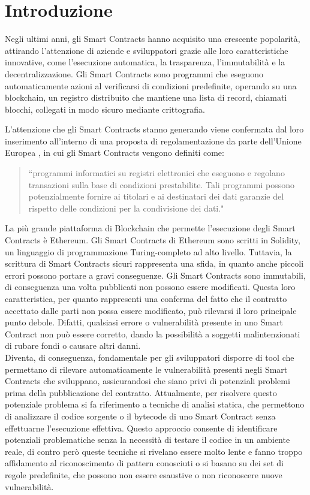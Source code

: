 \documentclass[../../Thesis.tex]{subfiles}
\begin{document}
\chapter{Introduzione}
Negli ultimi anni, gli Smart Contracts hanno acquisito una crescente popolarit\`a, attirando l'attenzione di aziende e sviluppatori grazie alle loro caratteristiche innovative, come l'esecuzione automatica, la trasparenza, l'immutabilit\`a e la decentralizzazione. Gli Smart Contracts sono programmi che eseguono automaticamente azioni al verificarsi di condizioni predefinite, operando su una blockchain, un registro distribuito che mantiene una lista di record, chiamati blocchi, collegati in modo sicuro mediante crittografia.

L'attenzione che gli Smart Contracts stanno generando viene confermata dal loro inserimento all'interno di una proposta di regolamentazione da parte dell'Unione Europea \cite{DataAct}, in cui gli Smart Contracts vengono definiti come: 
\begin{quotation}
    ``programmi informatici su registri elettronici che eseguono e regolano transazioni sulla base di condizioni prestabilite. Tali programmi possono potenzialmente fornire ai titolari e ai destinatari dei dati garanzie del rispetto delle condizioni per la condivisione dei dati."
\end{quotation}


La pi\`u grande piattaforma di Blockchain che permette l'esecuzione degli Smart Contracts \`e Ethereum. Gli Smart Contracts di Ethereum sono scritti in Solidity, un linguaggio di programmazione Turing-completo ad alto livello. Tuttavia, la scrittura di Smart Contracts sicuri rappresenta una sfida, in quanto anche piccoli errori possono portare a gravi conseguenze. Gli Smart Contracts sono immutabili, di conseguenza una volta pubblicati non possono essere modificati. Questa loro caratteristica, per quanto rappresenti una conferma del fatto che il contratto accettato dalle parti non possa essere modificato, pu\`o rilevarsi il loro principale punto debole. Difatti, qualsiasi errore o vulnerabilit\`a presente in uno Smart Contract non pu\`o essere corretto, dando la possibilit\`a a soggetti malintenzionati di rubare fondi o causare altri danni.\\

Diventa, di conseguenza, fondamentale per gli sviluppatori disporre di tool che permettano di rilevare automaticamente le vulnerabilit\`a presenti negli Smart Contracts che sviluppano, assicurandosi che siano privi di potenziali problemi prima della pubblicazione del contratto. Attualmente, per risolvere questo potenziale problema si fa riferimento a tecniche di analisi statica, che permettono di analizzare il codice sorgente o il bytecode di uno Smart Contract senza effettuarne l'esecuzione effettiva. Questo approccio consente di identificare potenziali problematiche senza la necessit\`a di testare il codice in un ambiente reale, di contro per\`o queste tecniche si rivelano essere molto lente e fanno troppo affidamento al riconoscimento di pattern conosciuti o si basano su dei set di regole predefinite, che possono non essere esaustive o non riconoscere nuove vulnerabilit\`a. 
\end{document}

